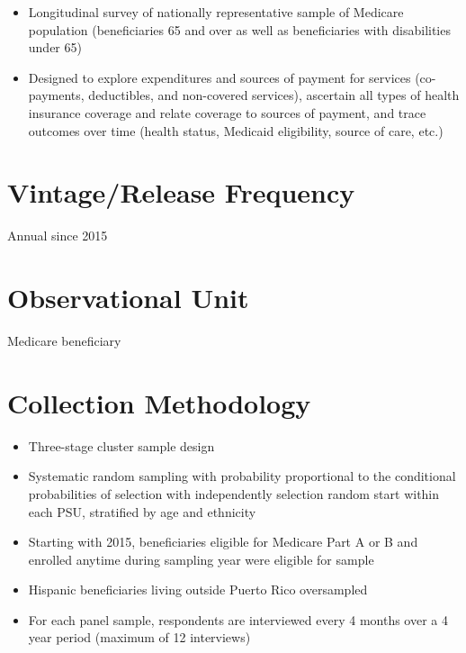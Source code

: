 \documentclass[
]{book}
\providecommand{\tightlist}{%
  \setlength{\itemsep}{0pt}\setlength{\parskip}{0pt}}
\begin{document}
\begin{itemize}
\tightlist
\item
  Longitudinal survey of nationally representative sample of Medicare population (beneficiaries 65 and over as well as beneficiaries with disabilities under 65)
\item
  Designed to explore expenditures and sources of payment for services (co-payments, deductibles, and non-covered services), ascertain all types of health insurance coverage and relate coverage to sources of payment, and trace outcomes over time (health status, Medicaid eligibility, source of care, etc.)
\end{itemize}

\hypertarget{vintagerelease-frequency-37}{%
\section{Vintage/Release Frequency}\label{vintagerelease-frequency-37}}

Annual since 2015

\hypertarget{observational-unit-37}{%
\section{Observational Unit}\label{observational-unit-37}}

Medicare beneficiary

\hypertarget{collection-methodology-37}{%
\section{Collection Methodology}\label{collection-methodology-37}}

\begin{itemize}
\tightlist
\item
  Three-stage cluster sample design
\item
  Systematic random sampling with probability proportional to the conditional probabilities of selection with independently selection random start within each PSU, stratified by age and ethnicity
\item
  Starting with 2015, beneficiaries eligible for Medicare Part A or B and enrolled anytime during sampling year were eligible for sample
\item
  Hispanic beneficiaries living outside Puerto Rico oversampled
\item
  For each panel sample, respondents are interviewed every 4 months over a 4 year period (maximum of 12 interviews)
\end{itemize}
\end{document}
